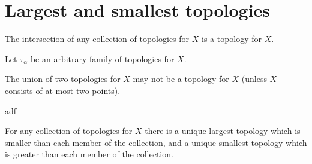 \section{Largest and smallest topologies}

\begin{problem}
  The intersection of any collection of topologies for $X$ is a topology for
  $X$.
\end{problem}

\begin{solution}
  Let $\tau_{\alpha}$ be an arbitrary family of topologies for $X$.
\end{solution}

\begin{problem}
  The union of two topologies for $X$ may not be a topology for $X$ (unless $X$
  consists of at most two points).
\end{problem}

\begin{solution}
  adf
\end{solution}

\begin{problem}
  For any collection of topologies for $X$ there is a unique largest topology
  which is smaller than each member of the collection, and a unique smallest
  topology which is greater than each member of the collection.
\end{problem}

